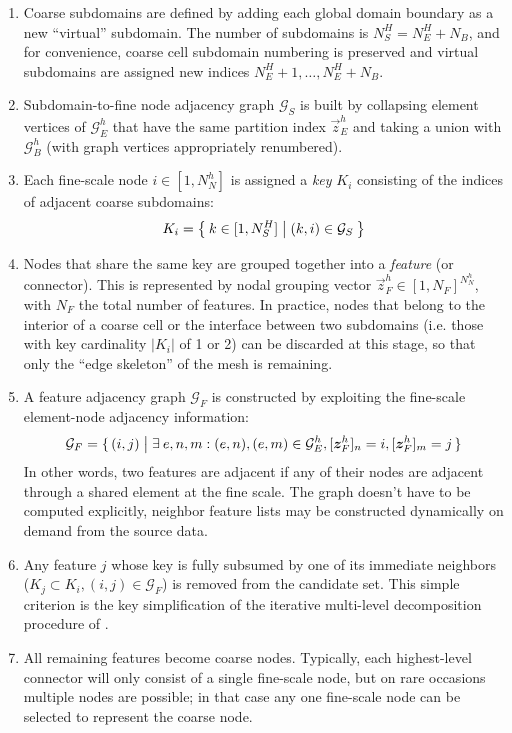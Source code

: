 \begin{enumerate}
    \item Coarse subdomains are defined by adding each global domain boundary as a new ``virtual'' subdomain.   The number of subdomains is $N_S^H = N_E^H + N_B$, and for convenience, coarse cell subdomain numbering is preserved and virtual subdomains are assigned new indices $N_E^H+1,\ldots,N_E^H+N_B$.
    \item Subdomain-to-fine node adjacency graph $\mathcal{G}_S$ is built by collapsing element vertices of $\mathcal{G}_E^h$ that have the same partition index $\vec{z}_E^h$ and taking a union with $\mathcal{G}_B^h$ (with graph vertices appropriately renumbered). 
    \item Each fine-scale node $i \in [1,N_N^h]$ is assigned a \textit{key} $K_i$ consisting of the indices of adjacent coarse subdomains:
    \begin{align}
        K_i = \Set{ k \in [1,N_S^H] \bigm| (k,i) \in \mathcal{G}_S }
    \end{align}
    \item Nodes that share the same key are grouped together into a \textit{feature} (or connector).   This is represented by nodal grouping vector $\vec{z}_F^h \in [1,N_F]^{N_N^h}$, with $N_F$ the total number of features.   In practice, nodes that belong to the interior of a coarse cell or the interface between two subdomains (i.e. those with key cardinality $|K_i|$ of 1 or 2) can be discarded at this stage, so that only the ``edge skeleton'' of the mesh is remaining.
    \item A feature adjacency graph $\mathcal{G}_F$ is constructed by exploiting the fine-scale element-node adjacency information:
    \begin{align}
        \mathcal{G}_F = \set{(i,j) \bigm| \exists \: e, n, m: (e,n), (e,m) \in \mathcal{G}_E^h, [\bm{z}_F^h]_n = i, [\bm{z}_F^h]_m = j}
    \end{align}
    In other words, two features are adjacent if any of their nodes are adjacent through a shared element at the fine scale.   The graph doesn't have to be computed explicitly, neighbor feature lists may be constructed dynamically on demand from the source data.
    \item Any feature $j$ whose key is fully subsumed by one of its immediate neighbors ($K_j \subset K_i, (i,j) \in \mathcal{G}_F$) is removed from the candidate set.   This simple criterion is the key simplification of the iterative multi-level decomposition procedure of \cite{Henon2006}.
    \item All remaining features become coarse nodes.   Typically, each highest-level connector will only consist of a single fine-scale node, but on rare occasions multiple nodes are possible; in that case any one fine-scale node can be selected to represent the coarse node.
\end{enumerate}

